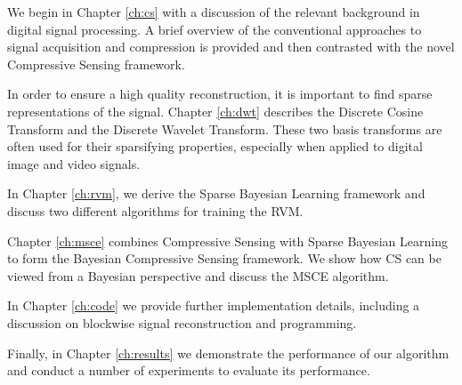 We begin in Chapter \ref{ch:cs} with a discussion of the relevant background in digital signal processing.
A brief overview of the conventional approaches to signal acquisition and compression is provided and then contrasted with the novel Compressive Sensing framework.

In order to ensure a high quality reconstruction, it is important to find sparse representations of the signal.
Chapter \ref{ch:dwt} describes the Discrete Cosine Transform and the Discrete Wavelet Transform.
These two basis transforms are often used for their sparsifying properties, especially when applied to digital image and video signals.

In Chapter \ref{ch:rvm}, we derive the Sparse Bayesian Learning framework and discuss two different algorithms for training the RVM.

Chapter \ref{ch:msce} combines Compressive Sensing with Sparse Bayesian Learning to form the Bayesian Compressive Sensing framework.
We show how CS can be viewed from a Bayesian perspective and discuss the MSCE algorithm.

In Chapter \ref{ch:code} we provide further implementation details, including a discussion on blockwise signal reconstruction and programming.

Finally, in Chapter \ref{ch:results} we demonstrate the performance of our algorithm and conduct a number of experiments to evaluate its performance.

